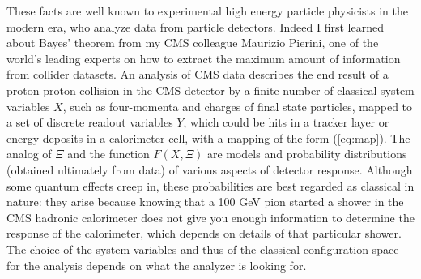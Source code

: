 \documentclass[a4paper,11pt]{article}
\begin{document}
These facts are well known to experimental high energy particle physicists in the modern era, who analyze data from
particle detectors. Indeed I first learned about Bayes' theorem from my CMS colleague Maurizio Pierini, one of the world's leading
experts on how to extract the maximum amount of information from collider datasets. An analysis of CMS data describes the end result of a
proton-proton collision in the CMS detector by a finite number of classical system variables $X$, such as four-momenta and charges of final state particles,
mapped to a set of discrete readout variables $Y$, which could be hits in a tracker layer or energy deposits in a calorimeter cell,
with a mapping of the form (\ref{eq:map}). The analog
of $\Xi$ and the function $F(X,\Xi)$ are models and probability distributions (obtained ultimately from data) of various aspects of detector response.
Although some quantum effects creep in, these probabilities are best regarded as classical in nature: 
they arise because knowing that a 100 GeV pion started a shower in the CMS hadronic calorimeter
does not give you enough information to determine the response of the calorimeter, which depends on details of that particular shower.
The choice of the system variables and thus of the classical configuration space for the analysis depends on what the
analyzer is looking for.
\end{document}
